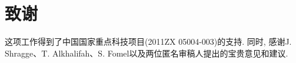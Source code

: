 \section{致谢}
这项工作得到了中国国家重点科技项目(2011ZX 05004-003)的支持. 同时, 感谢J. Shragge、T. Alkhalifah、S. Fomel以及两位匿名审稿人提出的宝贵意见和建议. 
